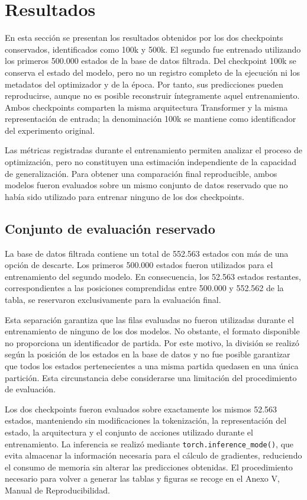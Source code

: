 \section{Resultados}

En esta sección se presentan los resultados obtenidos por los dos checkpoints conservados, identificados como 100k y 500k. El segundo fue entrenado utilizando los primeros 500.000 estados de la base de datos filtrada. Del checkpoint 100k se conserva el estado del modelo, pero no un registro completo de la ejecución ni los metadatos del optimizador y de la época. Por tanto, sus predicciones pueden reproducirse, aunque no es posible reconstruir íntegramente aquel entrenamiento. Ambos checkpoints comparten la misma arquitectura Transformer y la misma representación de entrada; la denominación 100k se mantiene como identificador del experimento original.

Las métricas registradas durante el entrenamiento permiten analizar el proceso de optimización, pero no constituyen una estimación independiente de la capacidad de generalización. Para obtener una comparación final reproducible, ambos modelos fueron evaluados sobre un mismo conjunto de datos reservado que no había sido utilizado para entrenar ninguno de los dos checkpoints.

\subsection{Conjunto de evaluación reservado}

La base de datos filtrada contiene un total de 552.563 estados con más de una opción de descarte. Los primeros 500.000 estados fueron utilizados para el entrenamiento del segundo modelo. En consecuencia, los 52.563 estados restantes, correspondientes a las posiciones comprendidas entre 500.000 y 552.562 de la tabla, se reservaron exclusivamente para la evaluación final.

Esta separación garantiza que las filas evaluadas no fueron utilizadas durante el entrenamiento de ninguno de los dos modelos. No obstante, el formato disponible no proporciona un identificador de partida. Por este motivo, la división se realizó según la posición de los estados en la base de datos y no fue posible garantizar que todos los estados pertenecientes a una misma partida quedasen en una única partición. Esta circunstancia debe considerarse una limitación del procedimiento de evaluación.

Los dos checkpoints fueron evaluados sobre exactamente los mismos 52.563 estados, manteniendo sin modificaciones la tokenización, la representación del estado, la arquitectura y el conjunto de acciones utilizado durante el entrenamiento. La inferencia se realizó mediante \texttt{torch.inference\_mode()}, que evita almacenar la información necesaria para el cálculo de gradientes, reduciendo el consumo de memoria sin alterar las predicciones obtenidas. El procedimiento necesario para volver a generar las tablas y figuras se recoge en el Anexo V, Manual de Reproducibilidad.

